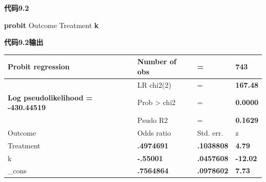 \documentclass[
  chinese-hans,
  letterpaper,
  DIV=11,
  numbers=noendperiod]{scrreprt}
\newenvironment{Shaded}{\begin{snugshade}}{\end{snugshade}}
\newcommand{\KeywordTok}[1]{\textcolor[rgb]{0.00,0.23,0.31}{\textbf{#1}}}
\newcommand{\NormalTok}[1]{\textcolor[rgb]{0.00,0.23,0.31}{#1}}
\newcounter{none} %
\begin{document}
\begin{tcolorbox}[enhanced jigsaw, arc=.35mm, bottomrule=.15mm, breakable, colback=white, colframe=quarto-callout-note-color-frame, left=2mm, leftrule=.75mm, opacityback=0, rightrule=.15mm, toprule=.15mm]

\vspace{-3mm}\textbf{代码9.2}\vspace{3mm}

\begin{Shaded}
\begin{Highlighting}[]
\KeywordTok{probit}\NormalTok{ Outcome Treatment }\KeywordTok{k}
\end{Highlighting}
\end{Shaded}

\end{tcolorbox}

\begin{tcolorbox}[enhanced jigsaw, arc=.35mm, bottomrule=.15mm, breakable, colback=white, colframe=quarto-callout-note-color-frame, left=2mm, leftrule=.75mm, opacityback=0, rightrule=.15mm, toprule=.15mm]

\vspace{-3mm}\textbf{代码9.2输出}\vspace{3mm}

{\def\LTcaptype{none} %
\begin{longtable}[]{@{}
  >{\centering\arraybackslash}p{}
  >{\raggedright\arraybackslash}p{}
  >{\centering\arraybackslash}p{}
  >{\centering\arraybackslash}p{}@{}}
\toprule\noalign{}
\begin{minipage}[b]{\linewidth}\centering
Probit regression
\end{minipage} & \begin{minipage}[b]{\linewidth}\raggedright
Number of obs
\end{minipage} & \begin{minipage}[b]{\linewidth}\centering
=
\end{minipage} & \begin{minipage}[b]{\linewidth}\centering
\textbf{743}
\end{minipage} \\
\midrule\noalign{}
\endhead
\bottomrule\noalign{}
\endlastfoot
& LR chi2(2) & = & \textbf{167.48} \\
\textbf{Log pseudolikelihood = -430.44519} & Prob \textgreater{} chi2 &
= & \textbf{0.0000} \\
& Psudo R2 & = & \textbf{0.1629} \\
Outcome & Odds ratio & Std. err. & z \\
Treatment & \textbf{.4974691} & \textbf{.1038808} & \textbf{4.79} \\
k & \textbf{-.55001} & \textbf{.0457608} & \textbf{-12.02} \\
\_cons & \textbf{.7564864} & \textbf{.0978602} & \textbf{7.73} \\
\end{longtable}
}

\end{tcolorbox}
\end{document}
